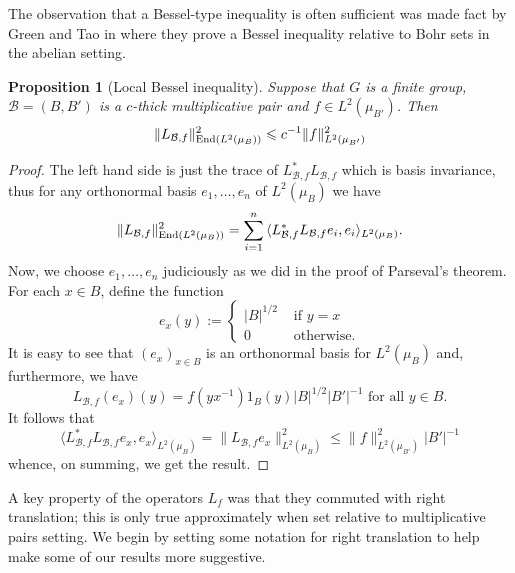 \documentclass[12pt]{amsart}
\numberwithin{equation}{section}
\theoremstyle{plain}
\newtheorem{proposition}[subsection]{Proposition}
\theoremstyle{definition}
\renewcommand{\leq}{\leqslant}
\providecommand{\End}{\mathop{\rm End}\nolimits}
\begin{document}
The observation that a Bessel-type inequality is often sufficient was made fact by Green and Tao in \cite{BJGTCTU3} where they prove a Bessel inequality relative to Bohr sets in the abelian setting.
\begin{proposition}[Local Bessel inequality]\label{prop.locbes}
Suppose that $G$ is a finite group, $\mathcal{B}=(B,B')$ is a $c$-thick multiplicative pair and $f \in L^2(\mu_{B'})$.  Then
\begin{equation*}
\|L_{\mathcal{B},f}\|_{\End(L^2(\mu_B))}^2 \leq c^{-1}\|f\|_{L^2(\mu_{B'})}^2
\end{equation*}
\end{proposition}
\begin{proof}
The left hand side is just the trace of $L_{\mathcal{B},f}^*L_{\mathcal{B},f}$ which is basis invariance, thus for any orthonormal basis $e_1,\dots,e_n$ of $L^2(\mu_{B})$ we have
\begin{equation*}
\|L_{\mathcal{B},f}\|_{\End(L^2(\mu_B))}^2 = \sum_{i=1}^n{\langle L_{\mathcal{B},f}^*L_{\mathcal{B},f}e_i,e_i\rangle_{L^2(\mu_{B})}}.
\end{equation*}
Now, we choose $e_1,\dots,e_n$ judiciously as we did in the proof of Parseval's theorem.  For each $x \in B$, define the function
\begin{equation*}
e_x(y):=\begin{cases} |B|^{1/2} & \textrm{ if } y=x\\ 0 & \textrm{ otherwise.} \end{cases}
\end{equation*}
It is easy to see that $(e_x)_{x \in B}$ is an orthonormal basis for $L^2(\mu_{B})$ and, furthermore, we have
\begin{equation*}
L_{\mathcal{B},f}(e_x)(y)=f(yx^{-1})1_B(y)|B|^{1/2}|B'|^{-1} \textrm{ for all } y \in B.
\end{equation*}
It follows that
\begin{equation*}
\langle L_{\mathcal{B},f}^*L_{\mathcal{B},f}e_x,e_x\rangle_{L^2(\mu_{B})} = \|L_{\mathcal{B},f}e_x\|_{L^2(\mu_B)}^2 \leq \|f\|_{L^2(\mu_{B'})}^2|B'|^{-1}
\end{equation*}
whence, on summing, we get the result.
\end{proof}
A key property of the operators $L_f$ was that they commuted with right translation; this is only true approximately when set relative to multiplicative pairs setting.  We begin by setting some notation for right translation to help make some of our results more suggestive.
\end{document}
